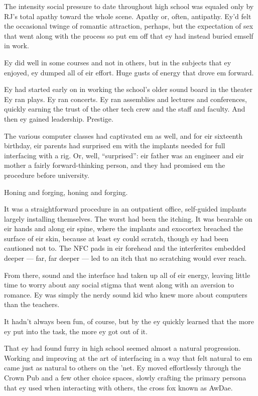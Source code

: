 The intensity social pressure to date throughout high school was equaled only by RJ's total apathy toward the whole scene. Apathy or, often, antipathy. Ey'd felt the occasional twinge of romantic attraction, perhaps, but the expectation of sex that went along with the process so put em off that ey had instead buried emself in work.

Ey did well in some courses and not in others, but in the subjects that ey enjoyed, ey dumped all of eir effort. Huge gusts of energy that drove em forward.

Ey had started early on in working the school's older sound board in the theater Ey ran plays. Ey ran concerts. Ey ran assemblies and lectures and conferences, quickly earning the trust of the other tech crew and the staff and faculty. And then ey gained leadership. Prestige.

The various computer classes had captivated em as well, and for eir sixteenth birthday, eir parents had surprised em with the implants needed for full interfacing with a rig. Or, well, ``surprised'': eir father was an engineer and eir mother a fairly forward-thinking person, and they had promised em the procedure before university.

Honing and forging, honing and forging.

It was a straightforward procedure in an outpatient office, self-guided implants largely installing themselves. The worst had been the itching. It was bearable on eir hands and along eir spine, where the implants and exocortex breached the surface of eir skin, because at least ey could scratch, though ey had been cautioned not to. The NFC pads in eir forehead and the interferites embedded deeper --- far, far deeper --- led to an itch that no scratching would ever reach.

From there, sound and the interface had taken up all of eir energy, leaving little time to worry about any social stigma that went along with an aversion to romance. Ey was simply the nerdy sound kid who knew more about computers than the teachers.

It hadn't always been fun, of course, but by the ey quickly learned that the more ey put into the task, the more ey got out of it.

That ey had found furry in high school seemed almost a natural progression. Working and improving at the art of interfacing in a way that felt natural to em came just as natural to others on the 'net. Ey moved effortlessly through the Crown Pub and a few other choice spaces, slowly crafting the primary persona that ey used when interacting with others, the cross fox known as AwDae.

